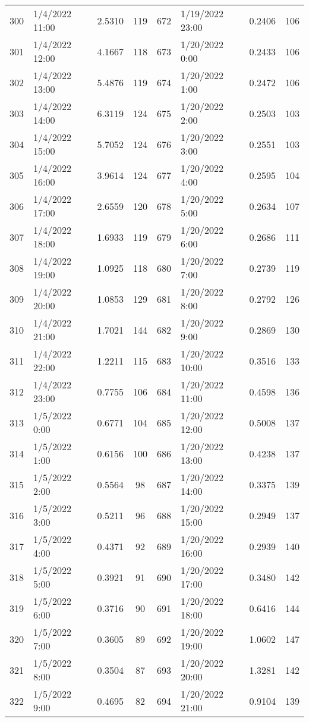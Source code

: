 \begin{center}
\begin{longtable}{llccllcc}
    300&1/4/2022 11:00	   &2.5310&119&672&1/19/2022 23:00	    &0.2406&106 \\
    301&1/4/2022 12:00	   &4.1667&118&673&1/20/2022 0:00	    &0.2433&106 \\
    302&1/4/2022 13:00	   &5.4876&119&674&1/20/2022 1:00	    &0.2472&106 \\
    303&1/4/2022 14:00	   &6.3119&124&675&1/20/2022 2:00	    &0.2503&103 \\
    304&1/4/2022 15:00	   &5.7052&124&676&1/20/2022 3:00	    &0.2551&103 \\
    305&1/4/2022 16:00	   &3.9614&124&677&1/20/2022 4:00	    &0.2595&104 \\
    306&1/4/2022 17:00	   &2.6559&120&678&1/20/2022 5:00	    &0.2634&107 \\
    307&1/4/2022 18:00	   &1.6933&119&679&1/20/2022 6:00	    &0.2686&111 \\
    308&1/4/2022 19:00	   &1.0925&118&680&1/20/2022 7:00	    &0.2739&119 \\
    309&1/4/2022 20:00	   &1.0853&129&681&1/20/2022 8:00	    &0.2792&126 \\
    310&1/4/2022 21:00	   &1.7021&144&682&1/20/2022 9:00	    &0.2869&130 \\
    311&1/4/2022 22:00	   &1.2211&115&683&1/20/2022 10:00	    &0.3516&133 \\
    312&1/4/2022 23:00	   &0.7755&106&684&1/20/2022 11:00	    &0.4598&136 \\
    313&1/5/2022 0:00	   &0.6771&104&685&1/20/2022 12:00	    &0.5008&137 \\
    314&1/5/2022 1:00	   &0.6156&100&686&1/20/2022 13:00	    &0.4238&137 \\
    315&1/5/2022 2:00	   &0.5564&98 &687&1/20/2022 14:00	    &0.3375&139 \\
    316&1/5/2022 3:00	   &0.5211&96 &688&1/20/2022 15:00	    &0.2949&137 \\
    317&1/5/2022 4:00	   &0.4371&92 &689&1/20/2022 16:00	    &0.2939&140 \\
    318&1/5/2022 5:00	   &0.3921&91 &690&1/20/2022 17:00	    &0.3480&142 \\
    319&1/5/2022 6:00	   &0.3716&90 &691&1/20/2022 18:00	    &0.6416&144 \\
    320&1/5/2022 7:00	   &0.3605&89 &692&1/20/2022 19:00	    &1.0602&147 \\
    321&1/5/2022 8:00	   &0.3504&87 &693&1/20/2022 20:00	    &1.3281&142 \\
    322&1/5/2022 9:00	   &0.4695&82 &694&1/20/2022 21:00	    &0.9104&139 \\

\end{longtable}
\end{center}
